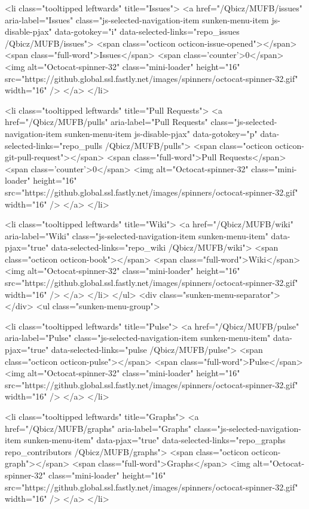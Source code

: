         <li class="tooltipped leftwards" title="Issues">
          <a href="/Qbicz/MUFB/issues" aria-label="Issues" class="js-selected-navigation-item sunken-menu-item js-disable-pjax" data-gotokey="i" data-selected-links="repo_issues /Qbicz/MUFB/issues">
            <span class="octicon octicon-issue-opened"></span> <span class="full-word">Issues</span>
            <span class='counter'>0</span>
            <img alt="Octocat-spinner-32" class="mini-loader" height="16" src="https://github.global.ssl.fastly.net/images/spinners/octocat-spinner-32.gif" width="16" />
</a>        </li>

      <li class="tooltipped leftwards" title="Pull Requests">
        <a href="/Qbicz/MUFB/pulls" aria-label="Pull Requests" class="js-selected-navigation-item sunken-menu-item js-disable-pjax" data-gotokey="p" data-selected-links="repo_pulls /Qbicz/MUFB/pulls">
            <span class="octicon octicon-git-pull-request"></span> <span class="full-word">Pull Requests</span>
            <span class='counter'>0</span>
            <img alt="Octocat-spinner-32" class="mini-loader" height="16" src="https://github.global.ssl.fastly.net/images/spinners/octocat-spinner-32.gif" width="16" />
</a>      </li>


        <li class="tooltipped leftwards" title="Wiki">
          <a href="/Qbicz/MUFB/wiki" aria-label="Wiki" class="js-selected-navigation-item sunken-menu-item" data-pjax="true" data-selected-links="repo_wiki /Qbicz/MUFB/wiki">
            <span class="octicon octicon-book"></span> <span class="full-word">Wiki</span>
            <img alt="Octocat-spinner-32" class="mini-loader" height="16" src="https://github.global.ssl.fastly.net/images/spinners/octocat-spinner-32.gif" width="16" />
</a>        </li>
    </ul>
    <div class="sunken-menu-separator"></div>
    <ul class="sunken-menu-group">

      <li class="tooltipped leftwards" title="Pulse">
        <a href="/Qbicz/MUFB/pulse" aria-label="Pulse" class="js-selected-navigation-item sunken-menu-item" data-pjax="true" data-selected-links="pulse /Qbicz/MUFB/pulse">
          <span class="octicon octicon-pulse"></span> <span class="full-word">Pulse</span>
          <img alt="Octocat-spinner-32" class="mini-loader" height="16" src="https://github.global.ssl.fastly.net/images/spinners/octocat-spinner-32.gif" width="16" />
</a>      </li>

      <li class="tooltipped leftwards" title="Graphs">
        <a href="/Qbicz/MUFB/graphs" aria-label="Graphs" class="js-selected-navigation-item sunken-menu-item" data-pjax="true" data-selected-links="repo_graphs repo_contributors /Qbicz/MUFB/graphs">
          <span class="octicon octicon-graph"></span> <span class="full-word">Graphs</span>
          <img alt="Octocat-spinner-32" class="mini-loader" height="16" src="https://github.global.ssl.fastly.net/images/spinners/octocat-spinner-32.gif" width="16" />
</a>      </li>

